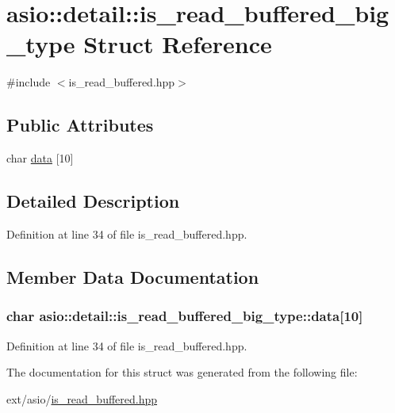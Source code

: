 \hypertarget{structasio_1_1detail_1_1is__read__buffered__big__type}{}\section{asio\+:\+:detail\+:\+:is\+\_\+read\+\_\+buffered\+\_\+big\+\_\+type Struct Reference}
\label{structasio_1_1detail_1_1is__read__buffered__big__type}


{\ttfamily \#include $<$is\+\_\+read\+\_\+buffered.\+hpp$>$}

\subsection*{Public Attributes}
\begin{DoxyCompactItemize}
\item 
char \hyperlink{structasio_1_1detail_1_1is__read__buffered__big__type_a15e5d1fca69c2cc08891a960ba2863af}{data} \mbox{[}10\mbox{]}
\end{DoxyCompactItemize}


\subsection{Detailed Description}


Definition at line 34 of file is\+\_\+read\+\_\+buffered.\+hpp.



\subsection{Member Data Documentation}
\hypertarget{structasio_1_1detail_1_1is__read__buffered__big__type_a15e5d1fca69c2cc08891a960ba2863af}{}
\subsubsection[{data}]{\setlength{\rightskip}{0pt plus 5cm}char asio\+::detail\+::is\+\_\+read\+\_\+buffered\+\_\+big\+\_\+type\+::data\mbox{[}10\mbox{]}}\label{structasio_1_1detail_1_1is__read__buffered__big__type_a15e5d1fca69c2cc08891a960ba2863af}


Definition at line 34 of file is\+\_\+read\+\_\+buffered.\+hpp.



The documentation for this struct was generated from the following file\+:\begin{DoxyCompactItemize}
\item 
ext/asio/\hyperlink{is__read__buffered_8hpp}{is\+\_\+read\+\_\+buffered.\+hpp}\end{DoxyCompactItemize}
